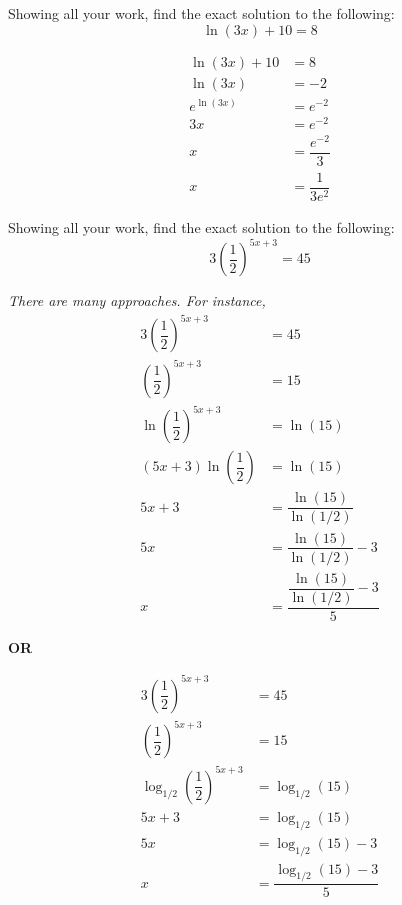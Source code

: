 \documentclass[12pt,letterpaper]{exam}
\begin{document}
\begin{questions}
\newpage
\question[10] Showing all your work, find the exact solution to the following: 
	\[
	\ln(3x) + 10= 8
	\] \pvspace{1.3cm}

	\[
	\begin{aligned}
	\ln(3x) + 10&= 8 \\[0.5cm]
	\ln(3x)&= -2 \\[0.5cm]
	e^{\ln(3x)}&= e^{-2} \\[0.5cm]
	3x&= e^{-2} \\[0.5cm]
	x&= \dfrac{e^{-2}}{3} \\[0.5cm]
	x&= \dfrac{1}{3e^2}
	\end{aligned}
	\]



\newpage
\question[10] Showing all your work, find the exact solution to the following: 
	\[
	3\left( \dfrac{1}{2} \right)^{5x + 3}= 45
	\] \pvspace{0.2cm}

{\itshape There are many approaches. For instance, \pvspace{0.1cm}
	\[
	\begin{aligned}
	3\left( \dfrac{1}{2} \right)^{5x + 3}&= 45 \\[0.25cm]
	\left( \dfrac{1}{2} \right)^{5x + 3}&= 15 \\[0.25cm]
	\ln\left( \dfrac{1}{2} \right)^{5x + 3}&= \ln(15) \\[0.25cm]
	(5x + 3) \ln\left( \dfrac{1}{2} \right)&= \ln(15) \\[0.25cm]
	5x + 3&= \dfrac{\ln(15)}{\ln(1/2)} \\[0.25cm]
	5x&= \dfrac{\ln(15)}{\ln(1/2)} - 3 \\[0.25cm]
	x&= \dfrac{\dfrac{\ln(15)}{\ln(1/2)} - 3}{5}
	\end{aligned}
	\] \pvspace{0.2cm}

\begin{center} {\bfseries OR} \end{center}

	\[
	\begin{aligned}
	3\left( \dfrac{1}{2} \right)^{5x + 3}&= 45 \\[0.25cm]
	\left( \dfrac{1}{2} \right)^{5x + 3}&= 15 \\[0.25cm]
	\log_{1/2} \left( \dfrac{1}{2} \right)^{5x + 3}&= \log_{1/2}(15) \\[0.25cm]
	5x + 3&= \log_{1/2}(15) \\[0.25cm]
	5x&= \log_{1/2}(15) - 3 \\[0.25cm]
	x&= \dfrac{\log_{1/2}(15) - 3}{5}
	\end{aligned}
	\]
}




\end{questions}
\end{document}
